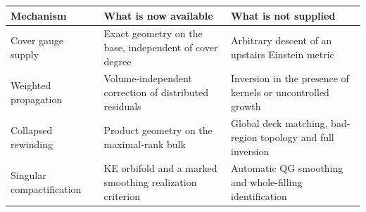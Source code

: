 \documentclass[
  11pt,
]{article}
\begin{document}
\begin{longtable}[]{@{}lll@{}}
\toprule
\begin{minipage}[b]{0.30\columnwidth}\raggedright
Mechanism\strut
\end{minipage} & \begin{minipage}[b]{0.30\columnwidth}\raggedright
What is now available\strut
\end{minipage} & \begin{minipage}[b]{0.30\columnwidth}\raggedright
What is not supplied\strut
\end{minipage}\tabularnewline
\midrule
\endhead
\begin{minipage}[t]{0.30\columnwidth}\raggedright
Cover gauge supply\strut
\end{minipage} & \begin{minipage}[t]{0.30\columnwidth}\raggedright
Exact geometry on the base, independent of cover degree\strut
\end{minipage} & \begin{minipage}[t]{0.30\columnwidth}\raggedright
Arbitrary descent of an upstairs Einstein metric\strut
\end{minipage}\tabularnewline
\begin{minipage}[t]{0.30\columnwidth}\raggedright
Weighted propagation\strut
\end{minipage} & \begin{minipage}[t]{0.30\columnwidth}\raggedright
Volume-independent correction of distributed residuals\strut
\end{minipage} & \begin{minipage}[t]{0.30\columnwidth}\raggedright
Inversion in the presence of kernels or uncontrolled growth\strut
\end{minipage}\tabularnewline
\begin{minipage}[t]{0.30\columnwidth}\raggedright
Collapsed rewinding\strut
\end{minipage} & \begin{minipage}[t]{0.30\columnwidth}\raggedright
Product geometry on the maximal-rank bulk\strut
\end{minipage} & \begin{minipage}[t]{0.30\columnwidth}\raggedright
Global deck matching, bad-region topology and full inversion\strut
\end{minipage}\tabularnewline
\begin{minipage}[t]{0.30\columnwidth}\raggedright
Singular compactification\strut
\end{minipage} & \begin{minipage}[t]{0.30\columnwidth}\raggedright
KE orbifold and a marked smoothing realization criterion\strut
\end{minipage} & \begin{minipage}[t]{0.30\columnwidth}\raggedright
Automatic QG smoothing and whole-filling identification\strut
\end{minipage}\tabularnewline
\bottomrule
\end{longtable}
\end{document}

